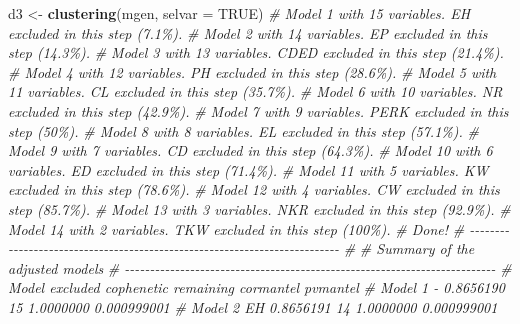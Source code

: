 \documentclass[
]{book}
\newenvironment{Shaded}{\begin{snugshade}}{\end{snugshade}}
\newcommand{\CommentTok}[1]{\textcolor[rgb]{0.56,0.35,0.01}{\textit{#1}}}
\newcommand{\DataTypeTok}[1]{\textcolor[rgb]{0.13,0.29,0.53}{#1}}
\newcommand{\KeywordTok}[1]{\textcolor[rgb]{0.13,0.29,0.53}{\textbf{#1}}}
\newcommand{\NormalTok}[1]{#1}
\newcommand{\OtherTok}[1]{\textcolor[rgb]{0.56,0.35,0.01}{#1}}
\newcommand{\StringTok}[1]{\textcolor[rgb]{0.31,0.60,0.02}{#1}}
\numberwithin{equation}{section}
\begin{document}
\begin{Shaded}
\begin{Highlighting}[]
\NormalTok{d3 \textless{}{-}}\StringTok{ }\KeywordTok{clustering}\NormalTok{(mgen, }\DataTypeTok{selvar =} \OtherTok{TRUE}\NormalTok{)}
\CommentTok{\# Model 1 with 15 variables. \textquotesingle{}EH\textquotesingle{} excluded in this step (7.1\%).}
\CommentTok{\# Model 2 with 14 variables. \textquotesingle{}EP\textquotesingle{} excluded in this step (14.3\%).}
\CommentTok{\# Model 3 with 13 variables. \textquotesingle{}CDED\textquotesingle{} excluded in this step (21.4\%).}
\CommentTok{\# Model 4 with 12 variables. \textquotesingle{}PH\textquotesingle{} excluded in this step (28.6\%).}
\CommentTok{\# Model 5 with 11 variables. \textquotesingle{}CL\textquotesingle{} excluded in this step (35.7\%).}
\CommentTok{\# Model 6 with 10 variables. \textquotesingle{}NR\textquotesingle{} excluded in this step (42.9\%).}
\CommentTok{\# Model 7 with 9 variables. \textquotesingle{}PERK\textquotesingle{} excluded in this step (50\%).}
\CommentTok{\# Model 8 with 8 variables. \textquotesingle{}EL\textquotesingle{} excluded in this step (57.1\%).}
\CommentTok{\# Model 9 with 7 variables. \textquotesingle{}CD\textquotesingle{} excluded in this step (64.3\%).}
\CommentTok{\# Model 10 with 6 variables. \textquotesingle{}ED\textquotesingle{} excluded in this step (71.4\%).}
\CommentTok{\# Model 11 with 5 variables. \textquotesingle{}KW\textquotesingle{} excluded in this step (78.6\%).}
\CommentTok{\# Model 12 with 4 variables. \textquotesingle{}CW\textquotesingle{} excluded in this step (85.7\%).}
\CommentTok{\# Model 13 with 3 variables. \textquotesingle{}NKR\textquotesingle{} excluded in this step (92.9\%).}
\CommentTok{\# Model 14 with 2 variables. \textquotesingle{}TKW\textquotesingle{} excluded in this step (100\%).}
\CommentTok{\# Done! }
\CommentTok{\# {-}{-}{-}{-}{-}{-}{-}{-}{-}{-}{-}{-}{-}{-}{-}{-}{-}{-}{-}{-}{-}{-}{-}{-}{-}{-}{-}{-}{-}{-}{-}{-}{-}{-}{-}{-}{-}{-}{-}{-}{-}{-}{-}{-}{-}{-}{-}{-}{-}{-}{-}{-}{-}{-}{-}{-}{-}{-}{-}{-}{-}{-}{-}{-}{-}{-}{-}{-}{-}{-}{-}{-}{-}{-} }
\CommentTok{\# }
\CommentTok{\# Summary of the adjusted models }
\CommentTok{\# {-}{-}{-}{-}{-}{-}{-}{-}{-}{-}{-}{-}{-}{-}{-}{-}{-}{-}{-}{-}{-}{-}{-}{-}{-}{-}{-}{-}{-}{-}{-}{-}{-}{-}{-}{-}{-}{-}{-}{-}{-}{-}{-}{-}{-}{-}{-}{-}{-}{-}{-}{-}{-}{-}{-}{-}{-}{-}{-}{-}{-}{-}{-}{-}{-}{-}{-}{-}{-}{-}{-}{-}{-}{-} }
\CommentTok{\#     Model excluded cophenetic remaining cormantel    pvmantel}
\CommentTok{\#   Model 1        {-}  0.8656190        15 1.0000000 0.000999001}
\CommentTok{\#   Model 2       EH  0.8656191        14 1.0000000 0.000999001}

\end{Highlighting}
\end{Shaded}
\end{document}
